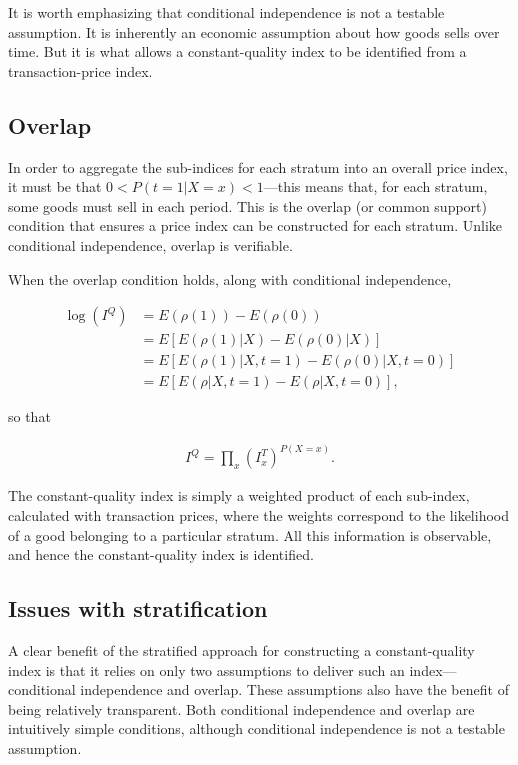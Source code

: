 \documentclass[]{article}
\begin{document}
It is worth emphasizing that conditional independence is not a testable assumption. It is inherently an economic assumption about how goods sells over time. But it is what allows a constant-quality index to be identified from a transaction-price index.

\hypertarget{overlap}{%
\subsection{Overlap}\label{overlap}}

In order to aggregate the sub-indices for each stratum into an overall price index, it must be that \(0 < P(t = 1 | X = x) < 1\)---this means that, for each stratum, some goods must sell in each period. This is the overlap (or common support) condition that ensures a price index can be constructed for each stratum. Unlike conditional independence, overlap is verifiable.

When the overlap condition holds, along with conditional independence,

\begin{align*}
\log(I^{Q}) &= E(\rho(1)) - E(\rho(0)) \\
&= E[E(\rho(1) | X) - E(\rho(0) | X)] \\
&= E[E(\rho(1) | X, t = 1) - E(\rho(0) | X, t = 0)] \\
&= E[E(\rho | X, t = 1) - E(\rho | X, t = 0)],
\end{align*}

so that

\begin{align*}
I^{Q} = \prod_{x} (I^{T}_{x})^{P(X = x)}.
\end{align*}

The constant-quality index is simply a weighted product of each sub-index, calculated with transaction prices, where the weights correspond to the likelihood of a good belonging to a particular stratum. All this information is observable, and hence the constant-quality index is identified.

\hypertarget{issues-with-stratification}{%
\subsection{Issues with stratification}\label{issues-with-stratification}}

A clear benefit of the stratified approach for constructing a constant-quality index is that it relies on only two assumptions to deliver such an index---conditional independence and overlap. These assumptions also have the benefit of being relatively transparent. Both conditional independence and overlap are intuitively simple conditions, although conditional independence is not a testable assumption.
\end{document}
